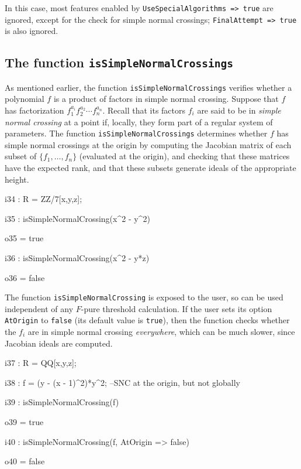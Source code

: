 \documentclass{amsart}
\begin{document}
\noindent In this case, most features enabled by \texttt{UseSpecialAlgorithms => true}
are ignored, except for the check for simple normal crossings;  \texttt{FinalAttempt => true}
is also ignored.

\subsection{The function \texttt{isSimpleNormalCrossings}} \label{subsec.SNC}
As mentioned earlier, the function \texttt{isSimpleNormalCrossings} verifies whether a polynomial $f$ is a product of factors in simple normal crossing.
Suppose that $f$ has factorization $f_1^{a_i} f_2^{a_2} \cdots f_n^{a_n}$.  Recall that its factors $f_i$ are said to be in
\emph{simple normal crossing} at a point if, locally, they form part of a regular system of parameters.  The function \texttt{isSimpleNormalCrossings} determines whether $f$ has simple normal crossings at the origin by computing the Jacobian matrix of each subset of $\{ f_1, \ldots, f_n \}$ (evaluated at the origin), and checking that these matrices have the expected rank, and that these subsets generate ideals of the appropriate height.

\smallskip
{\small
{}
\begin{MyVerbatim}
i34 : R = ZZ/7[x,y,z];

i35 : isSimpleNormalCrossing(x^2 - y^2)

o35 = true

i36 : isSimpleNormalCrossing(x^2 - y*z)

o36 = false
\end{MyVerbatim}
}
\smallskip

The function \texttt{isSimpleNormalCrossing} is exposed to the user, so can be used independent of any $F$-pure threshold calculation.
If the user sets its option \texttt{AtOrigin} to \texttt{false} (its default value is \texttt{true}), then the function checks whether the $f_i$ are in simple normal crossing \emph{everywhere}, which can be much slower, since Jacobian ideals are computed.

\smallskip
{\small
{}
\begin{MyVerbatim}
i37 : R = QQ[x,y,z];

i38 : f = (y - (x - 1)^2)*y^2; --SNC at the origin, but not globally

i39 : isSimpleNormalCrossing(f)

o39 = true

i40 : isSimpleNormalCrossing(f, AtOrigin => false)

o40 = false
\end{MyVerbatim}
}
\smallskip
\end{document}
